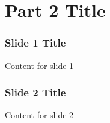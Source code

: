 \section{Part 2 Title}

\begin{frame}
\frametitle{Slide 1 Title}
Content for slide 1
\end{frame}


\begin{frame}
\frametitle{Slide 2 Title}
Content for slide 2
\end{frame}
